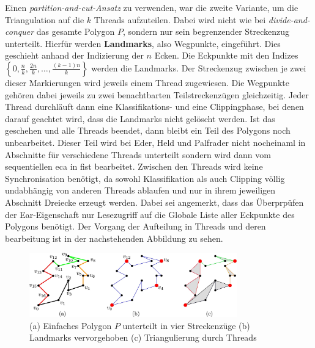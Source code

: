 Einen \emph{partition-and-cut-Ansatz} zu verwenden, war die zweite Variante, um die Triangulation auf die $k$ Threads aufzuteilen. Dabei wird nicht wie bei \emph{divide-and-conquer} das gesamte Polygon $P$, sondern nur sein begrenzender Streckenzug unterteilt.
Hierfür werden \textbf{Landmarks}, also Wegpunkte, eingeführt. Dies geschieht anhand der Indizierung der $n$ Ecken. Die Eckpunkte mit den Indizes $\left\{ 0, \frac{n}{k}, \frac{2n}{k}, \dots, \frac{(k-1)n}{k} \right\}$ werden die Landmarks. Der Streckenzug zwischen je zwei dieser Markierungen wird 
jeweils einem Thread zugewiesen. Die Wegpunkte gehören dabei jeweils zu zwei benachtbarten Teilstreckenzügen gleichzeitig. Jeder Thread durchläuft dann eine Klassifikations- und eine Clippingphase, bei denen darauf geachtet wird, dass die Landmarks nicht gelöscht werden.
Ist das geschehen und alle Threads beendet, dann bleibt ein Teil des Polygons noch unbearbeitet. Dieser Teil wird bei Eder, Held und Palfrader nicht nocheinaml in Abschnitte für verschiedene Threads unterteilt sondern wird dann vom sequentiellen \ac{eca} in \ac{fist} bearbeitet.
Zwischen den Threads wird keine Synchronisation benötigt, da sowohl Klassifikation als auch Clipping völlig undabhängig von anderen Threads ablaufen und nur in ihrem jeweiligen Abschnitt Dreiecke erzeugt werden. Dabei sei angemerkt, dass das Überprpüfen der Ear-Eigenschaft nur Lesezugriff auf 
die Globale Liste aller Eckpunkte des Polygons benötigt. Der Vorgang der Aufteilung in Threads und deren bearbeitung ist in der nachstehenden Abbildung zu sehen. \linebreak
\begin{figure}[h]
    \centering
    \includegraphics[width=0.8\textwidth]{bilder/segmentierung.jpg}
    \caption[Unterteilung des Streckenzugs in Unterstreckenzüge mittels Landmarks für Parallelisierung]{\centering (a) Einfaches Polygon $P$ unterteilt in vier Streckenzüge (b) Landmarks vervorgehoben (c) Triangulierung durch Threads}
    \label{fig:langmarks}
\end{figure}

